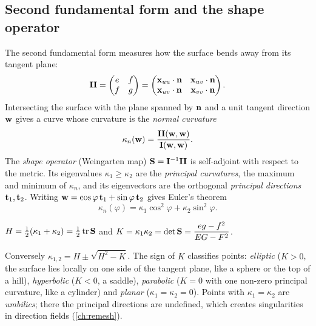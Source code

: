 \subsection{Second fundamental form and the shape operator}

The second fundamental form measures how the surface bends away from its tangent plane:
\begin{equation}
\mathbf{II}=\begin{pmatrix}e&f\\f&g\end{pmatrix}=\begin{pmatrix}\mathbf{x}_{uu}\cdot\mathbf{n}&\mathbf{x}_{uv}\cdot\mathbf{n}\\
\mathbf{x}_{uv}\cdot\mathbf{n}&\mathbf{x}_{vv}\cdot\mathbf{n}\end{pmatrix}.
\end{equation}
Intersecting the surface with the plane spanned by $\mathbf{n}$ and a unit tangent direction $\mathbf{w}$ gives a
curve whose curvature is the \emph{normal curvature}
\begin{equation}
\kappa_n(\mathbf{w})=\frac{\mathbf{II}(\mathbf{w},\mathbf{w})}{\mathbf{I}(\mathbf{w},\mathbf{w})} .
\end{equation}
The \emph{shape operator} (Weingarten map) $\mathbf{S}=\mathbf{I}^{-1}\mathbf{II}$ is self-adjoint with
respect to the metric. Its eigenvalues $\kappa_1\ge\kappa_2$ are the \emph{principal curvatures},
the maximum and minimum of $\kappa_n$, and its eigenvectors are the orthogonal \emph{principal
directions} $\mathbf{t}_1,\mathbf{t}_2$. Writing $\mathbf{w}=\cos\varphi\,\mathbf{t}_1+\sin\varphi\,\mathbf{t}_2$ gives Euler's
theorem
\begin{equation}
\kappa_n(\varphi)=\kappa_1\cos^2\varphi+\kappa_2\sin^2\varphi .
\end{equation}

\begin{definition}
$H=\tfrac12(\kappa_1+\kappa_2)=\tfrac12\operatorname{tr}\mathbf{S}$ and
$K=\kappa_1\kappa_2=\det\mathbf{S}=\dfrac{eg-f^2}{EG-F^2}$.
\end{definition}

Conversely $\kappa_{1,2}=H\pm\sqrt{H^2-K}$. The sign of $K$ classifies points: \emph{elliptic}
($K>0$, the surface lies locally on one side of the tangent plane, like a sphere or the top of a
hill), \emph{hyperbolic} ($K<0$, a saddle), \emph{parabolic} ($K=0$ with one non-zero principal
curvature, like a cylinder) and \emph{planar} ($\kappa_1=\kappa_2=0$). Points with
$\kappa_1=\kappa_2$ are \emph{umbilics}; there the principal directions are undefined, which
creates singularities in direction fields (\cref{ch:remesh}).

